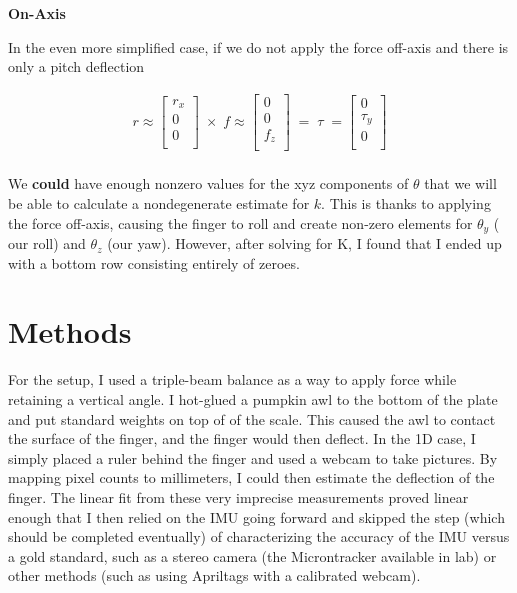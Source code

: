 \documentclass[12pt]{article}
\begin{document}
\textbf{On-Axis}

In the even more simplified case, if we do not apply the force off-axis and there is only a pitch
deflection

\begin{align}
r \approx
\begin{bmatrix}
    r_x       \\
    0       \\
    0       \\
\end{bmatrix} \; \times \;
f \approx
\begin{bmatrix}
    0       \\
    0       \\
    f_z      \\
\end{bmatrix} \; =  \; \tau \; = 
\begin{bmatrix}
    0 \\
    \tau_y       \\
    0      \\
\end{bmatrix}\\
\end{align}

We \textbf{could} have enough nonzero values for the xyz components of $\theta$ that we will be able
to calculate a nondegenerate estimate for $k$. This is thanks to applying the force off-axis,
causing the finger to roll and create non-zero elements for $\theta_y$ ( our roll) and $\theta_z$
(our yaw). However, after solving for K, I found that I ended up with a bottom row consisting
entirely of zeroes.


\section{Methods}

For the setup, I used a triple-beam balance as a way to apply force while retaining a vertical
angle. I hot-glued a pumpkin awl to the bottom of the plate and put standard weights on top of of
the scale. This caused the awl to contact the surface of the finger, and the finger would then
deflect. In the 1D case, I simply placed a ruler behind the finger and used a webcam to take
pictures. By mapping pixel counts to millimeters, I could then estimate the deflection of the
finger. The linear fit from these very imprecise measurements proved linear enough that I then
relied on the IMU going forward and skipped the step (which should be completed eventually) of
characterizing the accuracy of the IMU versus a gold standard, such as a stereo camera (the
Microntracker available in lab) or other methods (such as using Apriltags with a calibrated webcam). 
\end{document}
